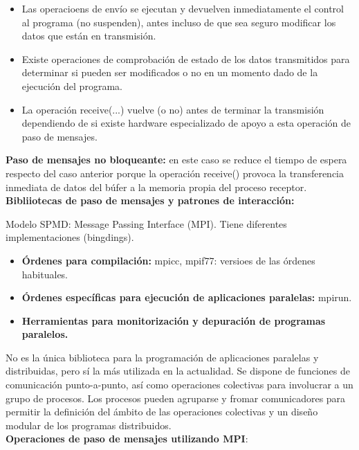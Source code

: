 \documentclass[a4paper,11pt]{article}
\begin{document}
\begin{itemize}
\item Las operacioens de envío se ejecutan y devuelven inmediatamente el control al programa (no suspenden), antes incluso de que sea seguro modificar los datos que están en transmisión.

\item Existe operaciones de comprobación de estado de los datos transmitidos para determinar si pueden ser modificados o no en un momento dado de la ejecución del programa.

\item La operación receive(...) vuelve (o no) antes de terminar la transmisión dependiendo de si existe hardware especializado de apoyo a esta operación de paso de mensajes.

\end{itemize}

\textbf{Paso de mensajes no bloqueante:} en este caso se reduce el tiempo de espera respecto del caso anterior porque la operación receive() provoca la transferencia inmediata de datos del búfer a la memoria propia del proceso receptor. \\

\textbf{Bibliiotecas de paso de mensajes y patrones de interacción:}

Modelo SPMD: Message Passing Interface (MPI). Tiene diferentes implementaciones (bingdings).

\begin{itemize}
\item \textbf{Órdenes para compilación:} mpicc, mpif77: versioes de las órdenes habituales.
\item \textbf{Órdenes específicas para ejecución de aplicaciones paralelas:} mpirun.
\item \textbf{Herramientas para monitorización y depuración de programas paralelos.}
\end{itemize}

No es la única biblioteca para la programación de aplicaciones paralelas y distribuidas, pero sí la más utilizada en la actualidad. Se dispone de funciones de comunicación punto-a-punto, así como operaciones colectivas para involucrar a un grupo de procesos. Los procesos pueden agruparse y fromar comunicadores para permitir la definición del ámbito de las operaciones colectivas y un diseño modular de los programas distribuidos. \\

\textbf{Operaciones de paso de mensajes utilizando MPI}:
\end{document}
